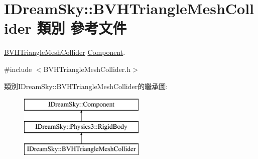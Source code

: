 \hypertarget{class_i_dream_sky_1_1_b_v_h_triangle_mesh_collider}{}\section{I\+Dream\+Sky\+:\+:B\+V\+H\+Triangle\+Mesh\+Collider 類別 參考文件}
\label{class_i_dream_sky_1_1_b_v_h_triangle_mesh_collider}


\hyperlink{class_i_dream_sky_1_1_b_v_h_triangle_mesh_collider}{B\+V\+H\+Triangle\+Mesh\+Collider} \hyperlink{class_i_dream_sky_1_1_component}{Component}.  




{\ttfamily \#include $<$B\+V\+H\+Triangle\+Mesh\+Collider.\+h$>$}

類別\+I\+Dream\+Sky\+:\+:B\+V\+H\+Triangle\+Mesh\+Collider的繼承圖\+:\begin{figure}[H]
\begin{center}
\leavevmode
\includegraphics[height=3.000000cm]{class_i_dream_sky_1_1_b_v_h_triangle_mesh_collider}
\end{center}
\end{figure}
